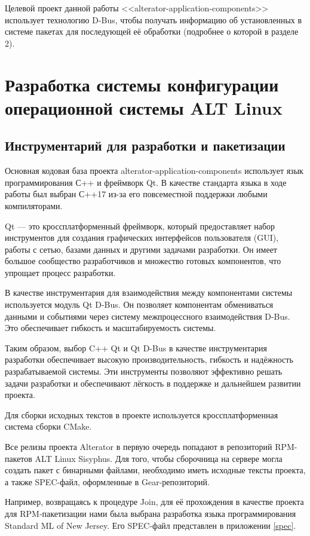 \documentclass[bachelor, och, pract]{SCWorks}
\begin{document}
Целевой проект данной работы  <<alterator-application-components>> использует технологию D-Bus, чтобы получать информацию об установленных в системе пакетах для последующей её обработки (подробнее о которой в разделе 2).

\newpage

\section{Разработка системы конфигурации операционной системы ALT Linux}

\subsection{Инструментарий для разработки и пакетизации}

Основная кодовая база проекта alterator-application-components использует язык программирования С++ и фреймворк Qt.
В качестве стандарта языка в ходе работы был выбран С++17 из-за его повсеместной поддержки любыми компиляторами.

Qt --- это кроссплатформенный фреймворк, который предоставляет набор инструментов для создания графических интерфейсов пользователя (GUI), работы с сетью, базами данных и другими задачами разработки.
Он имеет большое сообщество разработчиков и множество готовых компонентов, что упрощает процесс разработки\cite{a_qt}.

В качестве инструментария для взаимодействия между компонентами системы используется модуль Qt D-Bus.
Он позволяет компонентам обмениваться данными и событиями через систему межпроцессного взаимодействия D-Bus.
Это обеспечивает гибкость и масштабируемость системы.

Таким образом, выбор C++ Qt и Qt D-Bus в качестве инструментария разработки обеспечивает высокую производительность, гибкость и надёжность разрабатываемой системы.
Эти инструменты позволяют эффективно решать задачи разработки и обеспечивают лёгкость в поддержке и дальнейшем развитии проекта.

Для сборки исходных текстов в проекте используется кроссплатформенная система сборки CMake.

Все релизы проекта Alterator в первую очередь попадают в репозиторий RPM-пакетов ALT Linux Sisyphus.
Для того, чтобы сборочница на сервере могла создать пакет с бинарными файлами, необходимо иметь исходные тексты проекта, а также SPEC-файл, оформленные в Gear-репозиторий.

Например, возвращаясь к процедуре Join, для её прохождения в качестве проекта для RPM-пакетизации нами была выбрана разработка языка программирования Standard ML of New Jersey\cite{a_smlnj}.
Его SPEC-файл представлен в приложении \ref{spec}.
\end{document}
